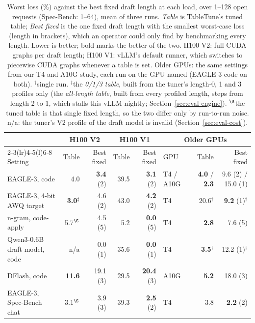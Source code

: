 \documentclass{article}
\newcommand{\sys}{TableTune}
\begin{document}
\begin{table}[t]
\centering
\small
\caption{Worst loss (\%) against the best fixed draft length at each load, over 1--128 open requests (Spec-Bench: 1--64), mean of three runs. \emph{Table} is \sys{}'s tuned table; \emph{Best fixed} is the one fixed draft length with the smallest worst-case loss (length in brackets), which an operator could only find by benchmarking every length. Lower is better; bold marks the better of the two. H100 V2: full CUDA graphs per draft length; H100 V1: vLLM's default runner, which switches to piecewise CUDA graphs whenever a table is set. Older GPUs: the same settings from our T4 and A10G study, each run on the GPU named (EAGLE-3 code on both). $^\dagger$single run. $^\ddagger$the \emph{0/1/3 table}, built from the tuner's length-0, 1 and 3 profiles only (the \emph{all-length table}, built from every profiled length, steps from length 2 to 1, which stalls this vLLM nightly; Section~\ref{sec:eval-engine}). $^\S$the tuned table is that single fixed length, so the two differ only by run-to-run noise. n/a: the tuner's V2 profile of the draft model is invalid (Section~\ref{sec:eval-cost}).}
\label{tab:main}
\vspace{3pt}
\setlength{\tabcolsep}{5pt}
\begin{tabular}{@{}l rr rr lrr@{}}
\toprule
 & \multicolumn{2}{c}{H100 V2} & \multicolumn{2}{c}{H100 V1} & \multicolumn{3}{c}{Older GPUs} \\
\cmidrule(lr){2-3}\cmidrule(lr){4-5}\cmidrule(l){6-8}
Setting & Table & Best fixed & Table & Best fixed & GPU & Table & Best fixed \\
\midrule
EAGLE-3, code & 4.0 & \textbf{3.4} (2) & 39.5 & \textbf{3.1} (2) & T4 / A10G & \textbf{4.0} / \textbf{2.3} & 9.6 (2) / 15.0 (1) \\
EAGLE-3, 4-bit AWQ target & \textbf{3.0}$^\ddagger$ & 4.6 (2) & 43.0 & \textbf{4.2} (2) & T4 & 20.6$^\dagger$ & \textbf{9.2} (1)$^\dagger$ \\
n-gram, code-apply & 5.7$^\S$ & 4.5 (5) & 5.2 & \textbf{0.0} (5) & T4 & \textbf{2.8} & 7.6 (5) \\
Qwen3-0.6B draft model, code & n/a & 0.0 (1) & 35.6 & \textbf{0.0} (1) & T4 & \textbf{3.5}$^\dagger$ & 12.2 (1)$^\dagger$ \\
DFlash, code & \textbf{11.6} & 19.1 (3) & 29.5 & \textbf{20.4} (3) & A10G & \textbf{5.2} & 18.0 (3) \\
EAGLE-3, Spec-Bench chat & 3.1$^\S$ & 3.9 (3) & 39.3 & \textbf{2.5} (2) & T4 & 3.8 & \textbf{2.2} (2) \\
\bottomrule
\end{tabular}
\vspace{-3mm}
\end{table}
\end{document}

